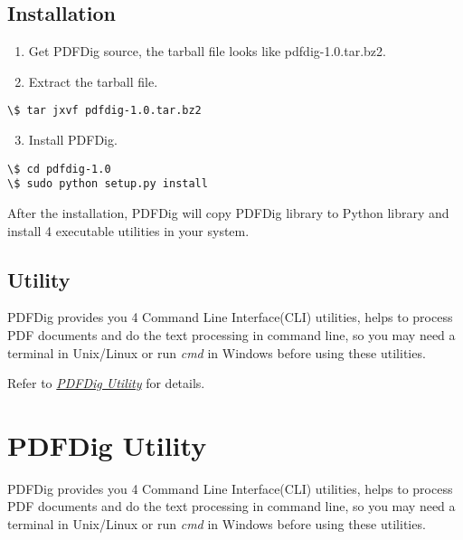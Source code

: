 \documentclass[letterpaper,10pt,oneside]{sphinxmanual}
\begin{document}
\section{Installation}
\label{tutorial:installation}\begin{enumerate}
\item {} 
Get PDFDig source, the tarball file looks like pdfdig-1.0.tar.bz2.

\item {} 
Extract the tarball file.

\end{enumerate}

\begin{Verbatim}[commandchars=\\\{\}]
\$ tar jxvf pdfdig-1.0.tar.bz2
\end{Verbatim}
\begin{enumerate}
\setcounter{enumi}{2}
\item {} 
Install PDFDig.

\end{enumerate}

\begin{Verbatim}[commandchars=\\\{\}]
\$ cd pdfdig-1.0
\$ sudo python setup.py install
\end{Verbatim}

After the installation, PDFDig will copy PDFDig library to Python library and install 4 executable utilities in your system.


\section{Utility}
\label{tutorial:utility}
PDFDig provides you 4 Command Line Interface(CLI) utilities, helps to process PDF documents and do the text processing in command line, so you may need a terminal in Unix/Linux or run \emph{cmd} in Windows before using these utilities.

Refer to {\hyperref[utility::doc]{\emph{PDFDig Utility}}} for details.


\chapter{PDFDig Utility}
\label{utility::doc}\label{utility:pdfdig-utility}
PDFDig provides you 4 Command Line Interface(CLI) utilities, helps to process PDF documents and do the text processing in command line, so you may need a terminal in Unix/Linux or run \emph{cmd} in Windows before using these utilities.
\end{document}
